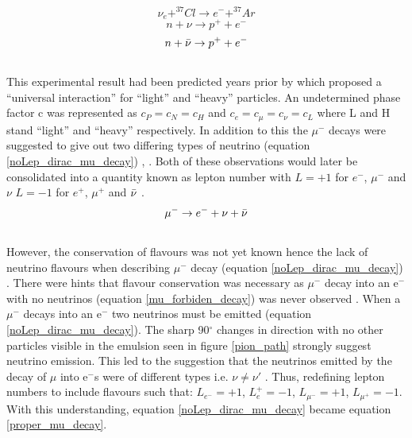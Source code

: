 \begin{equation}
    \nu_e + ^{37}Cl \rightarrow  e^- + ^{37}Ar
    \label{neutrino_chlorine_decay}
\end{equation}
\begin{equation}
    n + \nu \rightarrow p^+ + e^-
    \label{no_lepNo_dirac_nu_capture}
\end{equation}
\begin{equation}
    n + \Bar{\nu} \rightarrow p^+ + e^-
    \label{no_lepNo_maj_nu_capture}
\end{equation}
\\This experimental result had been predicted years prior by \cite{konopinski1953universal} which proposed a ``universal interaction'' for ``light'' and ``heavy'' particles. An undetermined phase factor c was represented as $c_P=c_N=c_H$ and $c_e=c_\mu=c_\nu=c_L$ where L and H stand ``light'' and ``heavy'' respectively. In addition to this the $\mu^-$ decays were suggested to give out two differing types of neutrino (equation \ref{noLep_dirac_mu_decay})  \cite{griffiths2008neutrino1.5}, \cite{konopinski1953universal}. Both of these observations would later be consolidated into a quantity known as lepton number with $L=+1$ for $e^-$, $\mu^-$ and $\nu$ $L=-1$ for $e^+$, $\mu^+$ and $\Bar{\nu}$ \cite{griffiths2008neutrino1.5}. 
\begin{equation}
    \mu^- \rightarrow e^- + \nu + \Bar{\nu}
    \label{noLep_dirac_mu_decay}
\end{equation}
\\However, the conservation of flavours was not yet known hence the lack of neutrino flavours when describing $\mu^-$ decay (equation \ref{noLep_dirac_mu_decay})  \cite{griffiths2008neutrino1.5}. There were hints that flavour conservation was necessary as $\mu^-$ decay into an e$^-$ with no neutrinos (equation \ref{mu_forbiden_decay}) was never observed \cite{griffiths2008neutrino1.5}. When a $\mu^-$ decays into an e$^-$ two neutrinos must be emitted (equation \ref{noLep_dirac_mu_decay}). The sharp 90$^\circ$ changes in direction with no other particles visible in the emulsion seen in figure \ref{pion_path} strongly suggest neutrino emission. This led to the suggestion that the neutrinos emitted by the decay of $\mu$ into e$^-$s were of different types i.e. $\nu \not= \nu'$ \cite{Lee:1960tja}  \cite{griffiths2008neutrino1.5}. Thus, redefining lepton numbers to include flavours such that: $L_{e^-} = +1$, $L_e^+ = -1$, $L_{\mu^-} = +1 $, $L_{\mu^+} = -1 $. With this understanding, equation \ref{noLep_dirac_mu_decay} became equation \ref{proper_mu_decay}.
